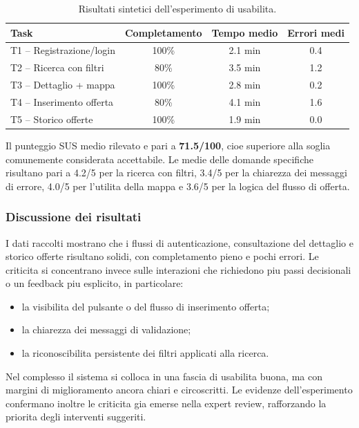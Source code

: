 \documentclass[a4paper,11pt]{article}
\begin{document}
\begin{table}[H]
\centering
\begin{tabularx}{\textwidth}{@{}l c c c@{}}
\toprule
Task & Completamento & Tempo medio & Errori medi \\
\midrule
T1 -- Registrazione/login & 100\% & 2.1 min & 0.4 \\
T2 -- Ricerca con filtri & 80\% & 3.5 min & 1.2 \\
T3 -- Dettaglio + mappa & 100\% & 2.8 min & 0.2 \\
T4 -- Inserimento offerta & 80\% & 4.1 min & 1.6 \\
T5 -- Storico offerte & 100\% & 1.9 min & 0.0 \\
\bottomrule
\end{tabularx}
\caption{Risultati sintetici dell'esperimento di usabilita.}
\label{tab:results}
\end{table}

Il punteggio SUS medio rilevato e pari a \textbf{71.5/100}, cioe superiore alla soglia comunemente considerata accettabile. Le medie delle domande specifiche risultano pari a 4.2/5 per la ricerca con filtri, 3.4/5 per la chiarezza dei messaggi di errore, 4.0/5 per l'utilita della mappa e 3.6/5 per la logica del flusso di offerta.

\subsubsection{Discussione dei risultati}
I dati raccolti mostrano che i flussi di autenticazione, consultazione del dettaglio e storico offerte risultano solidi, con completamento pieno e pochi errori. Le criticita si concentrano invece sulle interazioni che richiedono piu passi decisionali o un feedback piu esplicito, in particolare:
\begin{itemize}
  \item la visibilita del pulsante o del flusso di inserimento offerta;
  \item la chiarezza dei messaggi di validazione;
  \item la riconoscibilita persistente dei filtri applicati alla ricerca.
\end{itemize}

Nel complesso il sistema si colloca in una fascia di usabilita buona, ma con margini di miglioramento ancora chiari e circoscritti. Le evidenze dell'esperimento confermano inoltre le criticita gia emerse nella expert review, rafforzando la priorita degli interventi suggeriti.
\end{document}
